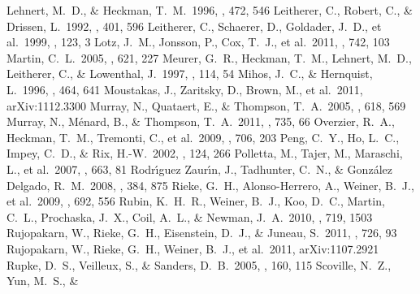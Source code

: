 \documentclass[apj]{emulateapj}
\begin{document}
\begin{thebibliography}{}
 Lehnert, M.~D., \& Heckman,
  T.~M.\ 1996, \apj, 472, 546
 Leitherer, C., Robert, C., \&
  Drissen, L.\ 1992, \apj, 401, 596
 Leitherer, C., Schaerer, D.,
  Goldader, J.~D., et al.\ 1999, \apjs, 123, 3
 Lotz, J.~M., Jonsson, P., Cox,
  T.~J., et al.\ 2011, \apj, 742, 103
 Martin, C.~L.\ 2005, \apj, 621, 227
 Meurer, G.~R., Heckman, T.~M.,
  Lehnert, M.~D., Leitherer, C., \& Lowenthal, J.\ 1997, \aj, 114, 54
 Mihos, J.~C., \& Hernquist,
  L.\ 1996, \apj, 464, 641
 Moustakas, J., Zaritsky, D.,
  Brown, M., et al.\ 2011, arXiv:1112.3300
 Murray, N., Quataert, E., \&
  Thompson, T.~A.\ 2005, \apj, 618, 569
 Murray, N., M{\'e}nard, B., \&
  Thompson, T.~A.\ 2011, \apj, 735, 66
 Overzier, R.~A., Heckman,
  T.~M., Tremonti, C., et al.\ 2009, \apj, 706, 203
 Peng, C.~Y., Ho, L.~C., Impey,
  C.~D., \& Rix, H.-W.\ 2002, \aj, 124, 266
 Polletta, M., Tajer, M.,
  Maraschi, L., et al.\ 2007, \apj, 663, 81
  Rodr{\'{\i}}guez Zaur{\'{\i}}n, J., Tadhunter, C.~N., \&
  Gonz{\'a}lez Delgado, R.~M.\ 2008, \mnras, 384, 875
 Rieke, G.~H., Alonso-Herrero, A.,
  Weiner, B.~J., et al.\ 2009, \apj, 692, 556
 Rubin, K.~H.~R., Weiner, B.~J.,
  Koo, D.~C., Martin, C.~L., Prochaska, J.~X., Coil, A.~L., \& Newman,
  J.~A.\ 2010, \apj, 719, 1503
 Rujopakarn, W.,
  Rieke, G.~H., Eisenstein, D.~J., \& Juneau, S.\ 2011, \apj, 726, 93
 Rujopakarn, W., Rieke, G.~H.,
  Weiner, B.~J., et al.\ 2011, arXiv:1107.2921
 Rupke, D.~S., Veilleux, S., \&
  Sanders, D.~B.\ 2005, \apjs, 160, 115 
 Scoville, N.~Z., Yun, M.~S., \&

\end{thebibliography}
\end{document}

